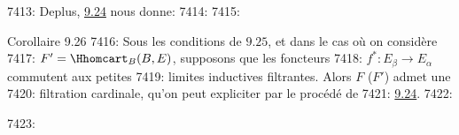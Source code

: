 7413: De\pageoriginale plus, \hyperref[I.cor9.24]{9.24} nous donne:
7414: 
7415: \begin{enonce*}{Corollaire 9.26}
7416: Sous les conditions de $9.25$, et dans le cas où on considère
7417: $F'=\Hhomcart_B(B,E)$, supposons que les foncteurs
7418: $f^\ast:E_{\beta}\rightarrow E_{\alpha}$ commutent aux petites
7419: limites inductives filtrantes. Alors $F$ (\resp $F'$) admet une
7420: filtration cardinale, qu'on peut expliciter par le procédé de
7421: \hyperref[I.cor9.24]{9.24}.
7422: \end{enonce*}
7423: 